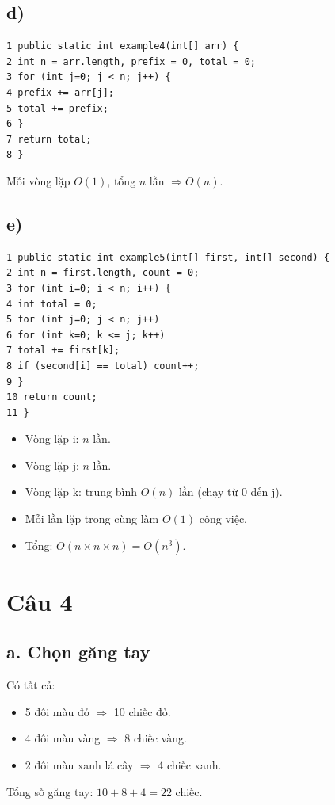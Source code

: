 \documentclass[12pt,a4paper]{article}
\begin{document}
\subsection*{d)}
\begin{verbatim}
1 public static int example4(int[] arr) {
2 int n = arr.length, prefix = 0, total = 0;
3 for (int j=0; j < n; j++) {
4 prefix += arr[j];
5 total += prefix;
6 }
7 return total;
8 }
\end{verbatim}
Mỗi vòng lặp $O(1)$, tổng $n$ lần $\Rightarrow O(n)$.

\subsection*{e)}
\begin{verbatim}
1 public static int example5(int[] first, int[] second) {
2 int n = first.length, count = 0;
3 for (int i=0; i < n; i++) {
4 int total = 0;
5 for (int j=0; j < n; j++)
6 for (int k=0; k <= j; k++)
7 total += first[k];
8 if (second[i] == total) count++;
9 }
10 return count;
11 }
\end{verbatim}
\begin{itemize}
    \item Vòng lặp i: $n$ lần.
    \item Vòng lặp j: $n$ lần.
    \item Vòng lặp k: trung bình $O(n)$ lần (chạy từ 0 đến j).
    \item Mỗi lần lặp trong cùng làm $O(1)$ công việc.
    \item Tổng: $O(n \times n \times n) = O(n^3)$.
\end{itemize}


\section*{Câu 4}

\subsection*{a. Chọn găng tay}
Có tất cả:
\begin{itemize}
    \item 5 đôi màu đỏ $\Rightarrow$ 10 chiếc đỏ.
    \item 4 đôi màu vàng $\Rightarrow$ 8 chiếc vàng.
    \item 2 đôi màu xanh lá cây $\Rightarrow$ 4 chiếc xanh.
\end{itemize}
Tổng số găng tay: $10+8+4 = 22$ chiếc.
\end{document}
